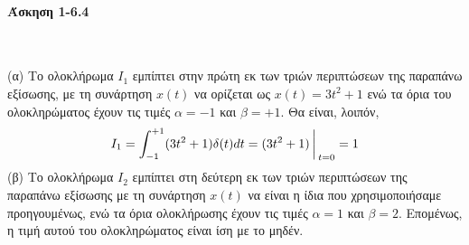 \documentclass[a4paper,twoside,10pt,openany]{memoir}
\theoremstyle{dotless}
\newcounter{problem}[section] %
\begin{document}
\pagestyle{empty}


\paragraph {Άσκηση 1-6.4}~\medskip


\begin{solution}
(α) Το ολοκλήρωμα $I_1$ εμπίπτει στην πρώτη εκ των τριών περιπτώσεων της παραπάνω εξίσωσης, με τη συνάρτηση $x(t)$ να ορίζεται ως $x(t)=3t^2+1$ ενώ τα όρια του ολοκληρώματος έχουν τις τιμές $\alpha=-1$ και $\beta=+1$. Θα είναι, λοιπόν,
\begin{equation*}
I_1=\int_{-1}^{+1}(3t^2+1)\delta(t)dt=(3t^2+1)\bigg\arrowvert_{t=0}=1
\end{equation*}
(β) Το ολοκλήρωμα $I_2$ εμπίπτει στη δεύτερη εκ των τριών περιπτώσεων της παραπάνω εξίσωσης με τη συνάρτηση $x(t)$ να είναι η ίδια που χρησιμοποιήσαμε προηγουμένως, ενώ τα όρια ολοκλήρωσης έχουν τις τιμές $\alpha=1$ και $\beta=2$. Επομένως, η τιμή αυτού του ολοκληρώματος είναι ίση με το μηδέν.
\end{solution}
\end{document}
